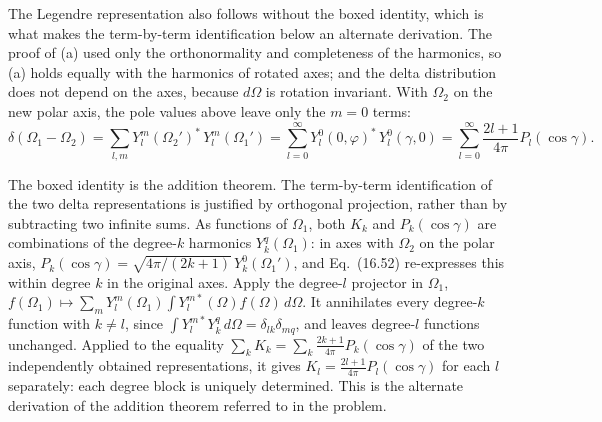 The Legendre representation also follows without the boxed identity,
which is what makes the term-by-term identification below an
alternate derivation. The proof of (a) used only the orthonormality
and completeness of the harmonics, so (a) holds equally with the
harmonics of rotated axes; and the delta distribution does not
depend on the axes, because $d\Omega$ is rotation invariant. With
$\Omega_2$ on the new polar axis, the pole values above leave only
the $m=0$ terms:
\[
\delta(\Omega_1-\Omega_2)
=\sum_{l,m}Y_l^m(\Omega_2')^*\,Y_l^m(\Omega_1')
=\sum_{l=0}^\infty Y_l^0(0,\varphi)^*\,Y_l^0(\gamma,0)
=\sum_{l=0}^\infty\frac{2l+1}{4\pi}P_l(\cos\gamma).
\]

The boxed identity is the addition theorem. The term-by-term
identification of the two delta representations is justified by
orthogonal projection, rather than by subtracting two infinite sums.
As functions of $\Omega_1$, both $K_k$ and $P_k(\cos\gamma)$ are
combinations of the degree-$k$ harmonics $Y_k^q(\Omega_1)$: in axes
with $\Omega_2$ on the polar axis,
$P_k(\cos\gamma)=\sqrt{4\pi/(2k+1)}\,Y_k^0(\Omega_1')$, and
Eq.~(16.52) re-expresses this within degree $k$ in the original axes.
Apply the degree-$l$ projector in $\Omega_1$,
$f(\Omega_1)\mapsto\sum_mY_l^m(\Omega_1)
\int Y_l^{m*}(\Omega)f(\Omega)\,d\Omega$.
It annihilates every degree-$k$ function with $k\ne l$, since
$\int Y_l^{m*}Y_k^q\,d\Omega=\delta_{lk}\delta_{mq}$, and leaves
degree-$l$ functions unchanged. Applied to the equality
$\sum_kK_k=\sum_k\frac{2k+1}{4\pi}P_k(\cos\gamma)$ of the two
independently obtained representations, it gives
$K_l=\frac{2l+1}{4\pi}P_l(\cos\gamma)$ for each $l$ separately:
each degree block is uniquely determined. This is the alternate
derivation of the addition theorem referred to in the problem.

